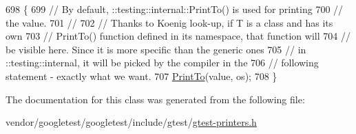 \begin{DoxyCode}
698                                                     \{
699     \textcolor{comment}{// By default, ::testing::internal::PrintTo() is used for printing}
700     \textcolor{comment}{// the value.}
701     \textcolor{comment}{//}
702     \textcolor{comment}{// Thanks to Koenig look-up, if T is a class and has its own}
703     \textcolor{comment}{// PrintTo() function defined in its namespace, that function will}
704     \textcolor{comment}{// be visible here.  Since it is more specific than the generic ones}
705     \textcolor{comment}{// in ::testing::internal, it will be picked by the compiler in the}
706     \textcolor{comment}{// following statement - exactly what we want.}
707     \hyperlink{namespacetesting_1_1internal_a880d891d434f918b29a382f90e47cecb}{PrintTo}(value, os);
708   \}
\end{DoxyCode}


The documentation for this class was generated from the following file\+:\begin{DoxyCompactItemize}
\item 
vendor/googletest/googletest/include/gtest/\hyperlink{gtest-printers_8h}{gtest-\/printers.\+h}\end{DoxyCompactItemize}
